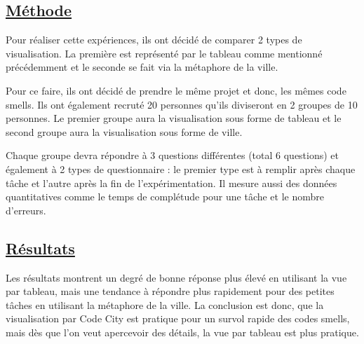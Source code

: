 \documentclass[a4paper,10pt, oneside]{article}
\newcommand{\li}{\newline}
\begin{document}
\subsection{\ul{Méthode}}
        \par Pour réaliser cette expériences, ils ont décidé de comparer 2 types de visualisation. La première est représenté par le tableau comme mentionné précédemment et le seconde se fait via la métaphore de la ville. \li
        \par Pour ce faire, ils ont décidé de prendre le même projet et donc, les mêmes code smells. Ils ont également recruté 20 personnes qu'ils diviseront en 2 groupes de 10 personnes. Le premier groupe aura la visualisation sous forme de tableau et le second groupe aura la visualisation sous forme de ville.
        \par Chaque groupe devra répondre à 3 questions différentes (total 6 questions) et également à 2 types de questionnaire : le premier type est à remplir après chaque tâche et l'autre après la fin de l'expérimentation. Il mesure aussi des données quantitatives comme le temps de complétude pour une tâche et le nombre d'erreurs. 
\subsection{\ul{Résultats}}
        \par Les résultats montrent un degré de bonne réponse plus élevé en utilisant la vue par tableau, mais une tendance à répondre plus rapidement pour des petites tâches en utilisant la métaphore de la ville.
        La conclusion est donc, que la visualisation par Code City est pratique pour un survol rapide des codes smells, mais dès que l'on veut apercevoir des détails, la vue par tableau est plus pratique.
        



\end{document}
